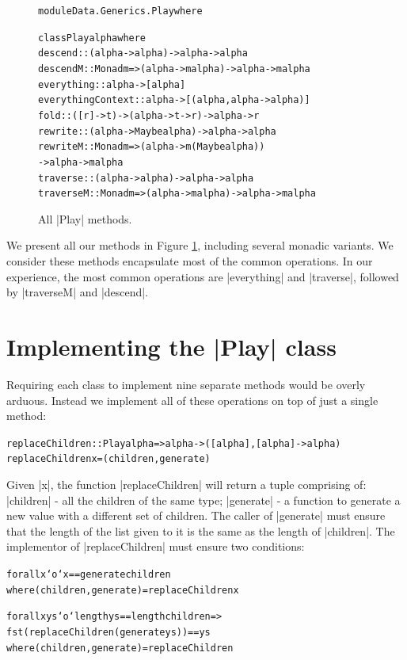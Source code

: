 \documentclass[preprint]{sigplanconf}
\newenvironment{code}{\begin{alltt}\small}{\end{alltt}}
\begin{document}
\begin{figure}
\begin{code}
module Data.Generics.Play where

class Play alpha where
    descend            :: (alpha -> alpha) -> alpha -> alpha
    descendM           :: Monad m => (alpha -> m alpha) -> alpha -> m alpha
    everything         :: alpha -> [alpha]
    everythingContext  :: alpha -> [(alpha, alpha -> alpha)]
    fold               :: ([r] -> t) -> (alpha -> t -> r) -> alpha -> r
    rewrite            :: (alpha -> Maybe alpha) -> alpha -> alpha
    rewriteM           :: Monad m  => (alpha -> m (Maybe alpha))
                                   -> alpha -> m alpha
    traverse           :: (alpha -> alpha) -> alpha -> alpha
    traverseM          :: Monad m => (alpha -> m alpha) -> alpha -> m alpha
\end{code}
\caption{All |Play| methods.}
\label{fig:play}
\end{figure}

We present all our methods in Figure \ref{fig:play}, including several monadic variants. We consider these methods encapsulate most of the common operations. In our experience, the most common operations are |everything| and |traverse|, followed by |traverseM| and |descend|.


\section{Implementing the |Play| class}
\label{sec:implement_play}

Requiring each class to implement nine separate methods would be overly arduous. Instead we implement all of these operations on top of just a single method:

\begin{code}
replaceChildren :: Play alpha => alpha -> ([alpha], [alpha] -> alpha)
replaceChildren x = (children,generate)
\end{code}

Given |x|, the function |replaceChildren| will return a tuple comprising of: |children| - all the children of the same type; |generate| - a function to generate a new value with a different set of children. The caller of |generate| must ensure that the length of the list given to it is the same as the length of |children|. The implementor of |replaceChildren| must ensure two conditions:

\begin{code}
forall x `o` x == generate children
    where (children,generate) = replaceChildren x

forall x ys `o`  length ys == length children =>
                 fst (replaceChildren (generate ys)) == ys
    where (children,generate) = replaceChildren
\end{code}
\end{document}
